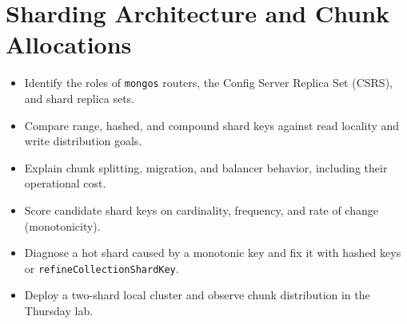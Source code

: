 \chapter{Sharding Architecture and Chunk Allocations}
%

\begin{objectives}
\begin{itemize}
    \item Identify the roles of \texttt{mongos} routers, the Config Server Replica Set (CSRS), and shard replica sets.
    \item Compare range, hashed, and compound shard keys against read locality and write distribution goals.
    \item Explain chunk splitting, migration, and balancer behavior, including their operational cost.
    \item Score candidate shard keys on cardinality, frequency, and rate of change (monotonicity).
    \item Diagnose a hot shard caused by a monotonic key and fix it with hashed keys or \texttt{refineCollectionShardKey}.
    \item Deploy a two-shard local cluster and observe chunk distribution in the Thursday lab.
\end{itemize}
\end{objectives}

